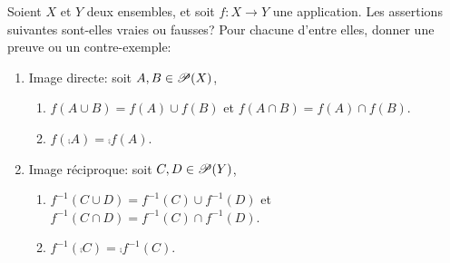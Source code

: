 {\begin{nntd-sol}[]
\begin{enumerate}
        \end{enumerate}
        
    \end{nntd-sol}
}{}
\begin{td-exo}
    Soient \(X\) et \(Y\) deux ensembles, et soit \(f:X\to Y\) une application. 
    Les assertions suivantes sont-elles vraies ou fausses? Pour chacune d'entre
    elles, donner une preuve ou un contre-exemple:
    \begin{enumerate}
        \item Image directe: soit \(A,B\in\mathscr{P}(X)\),
            \begin{enumerate}
                \item \(f(A\cup B) = f(A)\cup f(B)\) et \(f(A\cap B) = f(A)\cap f(B)\).
                \item \(f(\comp{A})=\comp{f(A)}\).
            \end{enumerate}
        \item Image réciproque: soit \(C,D\in\mathscr{P}(Y)\),
            \begin{enumerate}
                \item \(f^{-1}(C\cup D) = f^{-1}(C)\cup f^{-1}(D)\) et \(f^{-1}(C\cap D) = f^{-1}(C)\cap f^{-1}(D)\).
                \item \(f^{-1}(\comp{C})=\comp{f^{-1}(C)}\).
            \end{enumerate}
    \end{enumerate}
\end{td-exo}
